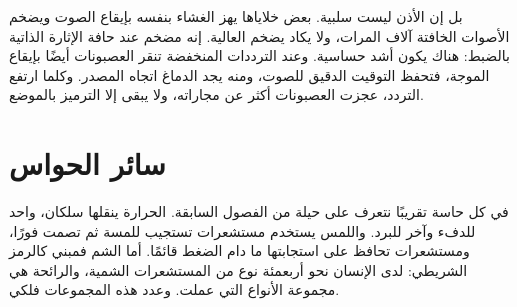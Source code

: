 
بل إن الأذن ليست سلبية. بعض خلاياها يهز الغشاء بنفسه بإيقاع الصوت ويضخم الأصوات الخافتة آلاف المرات، ولا يكاد يضخم العالية. إنه مضخم عند حافة الإثارة الذاتية بالضبط: هناك يكون أشد حساسية. وعند الترددات المنخفضة تنقر العصبونات أيضًا بإيقاع الموجة، فتحفظ التوقيت الدقيق للصوت، ومنه يجد الدماغ اتجاه المصدر. وكلما ارتفع التردد، عجزت العصبونات أكثر عن مجاراته، ولا يبقى إلا الترميز بالموضع.

\section*{سائر الحواس}

في كل حاسة تقريبًا نتعرف على حيلة من الفصول السابقة. الحرارة ينقلها سلكان، واحد للدفء وآخر للبرد. واللمس يستخدم مستشعرات تستجيب للمسة ثم تصمت فورًا، ومستشعرات تحافظ على استجابتها ما دام الضغط قائمًا. أما الشم فمبني كالرمز الشريطي: لدى الإنسان نحو أربعمئة نوع من المستشعرات الشمية، والرائحة هي مجموعة الأنواع التي عملت. وعدد هذه المجموعات فلكي.

